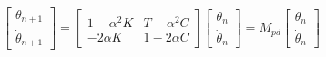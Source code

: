 \begin{align}
\label{eq:PoincareMapPD}
\begin{bmatrix}
\theta_{n+1}  \\
\dot \theta_{n+1}
\end{bmatrix} = \begin{bmatrix}
1-\alpha^2 K & T-\alpha^2 C \\
-2\alpha K & 1-2\alpha C
\end{bmatrix}\begin{bmatrix}
 \theta_n  \\
\dot \theta_n 
\end{bmatrix} = M_{pd}
\begin{bmatrix}
 \theta_n  \\
\dot \theta_n 
\end{bmatrix}
\end{align}







\pagebreak

















